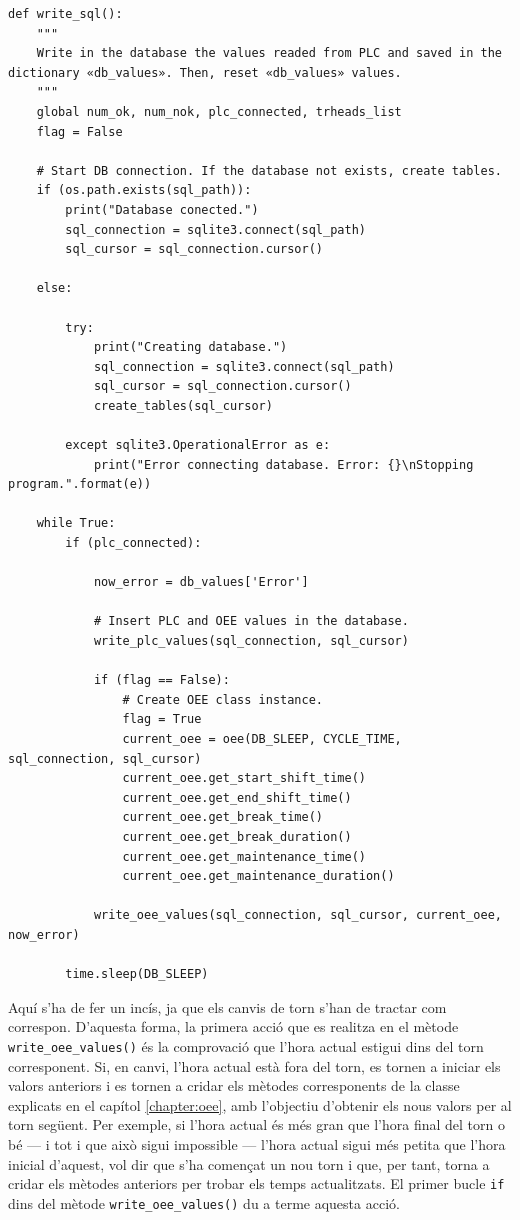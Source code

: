 \documentclass{tfgitic}[2022/06/30]
\begin{document}
\begin{lstlisting}[style=Python]
def write_sql():
    """
    Write in the database the values readed from PLC and saved in the dictionary «db_values». Then, reset «db_values» values.
    """
    global num_ok, num_nok, plc_connected, trheads_list
    flag = False

    # Start DB connection. If the database not exists, create tables.
    if (os.path.exists(sql_path)):
        print("Database conected.")
        sql_connection = sqlite3.connect(sql_path)
        sql_cursor = sql_connection.cursor()
 
    else:
 
        try:
            print("Creating database.")
            sql_connection = sqlite3.connect(sql_path)
            sql_cursor = sql_connection.cursor()
            create_tables(sql_cursor)
 
        except sqlite3.OperationalError as e:
            print("Error connecting database. Error: {}\nStopping program.".format(e))

    while True:
        if (plc_connected):

            now_error = db_values['Error']

            # Insert PLC and OEE values in the database.
            write_plc_values(sql_connection, sql_cursor)

            if (flag == False):
                # Create OEE class instance.
                flag = True
                current_oee = oee(DB_SLEEP, CYCLE_TIME, sql_connection, sql_cursor)
                current_oee.get_start_shift_time()
                current_oee.get_end_shift_time()
                current_oee.get_break_time()
                current_oee.get_break_duration()
                current_oee.get_maintenance_time()
                current_oee.get_maintenance_duration()

            write_oee_values(sql_connection, sql_cursor, current_oee, now_error)

        time.sleep(DB_SLEEP)
\end{lstlisting}

Aquí s'ha de fer un incís, ja que els canvis de torn s'han de tractar com correspon. D'aquesta forma, la primera acció que es realitza en el mètode \texttt{write\_oee\_values()} és la comprovació que l'hora actual estigui dins del torn corresponent. Si, en canvi, l'hora actual està fora del torn, es tornen a iniciar els valors anteriors i es tornen a cridar els mètodes corresponents de la classe  explicats en el capítol \ref{chapter:oee}, amb l'objectiu d'obtenir els nous valors per al torn següent. Per exemple, si l'hora actual és més gran que l'hora final del torn o bé --- i tot i que això sigui impossible --- l'hora actual sigui més petita que l'hora inicial d'aquest, vol dir que s'ha començat un nou torn i que, per tant, torna a cridar els mètodes anteriors per trobar els temps actualitzats. El primer bucle \texttt{if} dins del mètode \texttt{write\_oee\_values()} du a terme aquesta acció.
\end{document}
